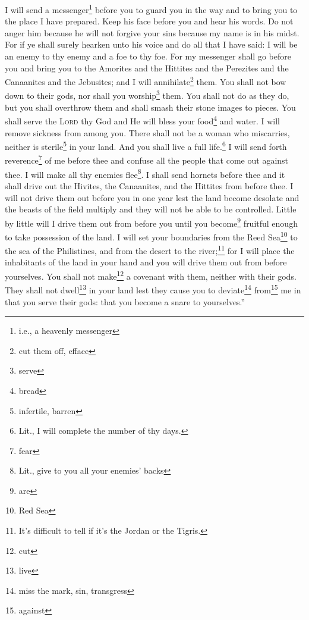 \begin{enumerate}[align=center]
     I will send a messenger\footnote{i.e., a heavenly messenger} before you to guard you in the way and to bring you to the place I have prepared.%
     Keep his face before you and hear his words. Do not anger him because he will not forgive your sins because my name is in his midst.%
     For if ye shall surely hearken unto his voice and do all that I have said: I will be an enemy to thy enemy and a foe to thy foe.%
     For my messenger shall go before you and bring you to the Amorites and the Hittites and the Perezites and the Canaanites and the Jebusites; and I will annihilate\footnote{cut them off, efface} them.%
     You shall not bow down to their gods, nor shall you worship\footnote{serve} them. You shall not do as they do, but you shall overthrow them and shall smash their stone images to pieces.%
     You shall serve the \textsc{Lord} thy God and He will bless your food\footnote{bread} and water. I will remove sickness from among you.%
     There shall not be a woman who miscarries, neither is sterile\footnote{infertile, barren} in your land. And you shall live a full life.\footnote{Lit., I will complete the number of thy days.}%
     I will send forth reverence\footnote{fear} of me before thee and confuse all the people that come out against thee. I will make all thy enemies flee\footnote{Lit., give to you all your enemies' backs}.%
     I shall send hornets before thee and it shall drive out the Hivites, the Canaanites, and the Hittites from before thee.%
     I will not drive them out before you in one year lest the land become desolate and the beasts of the field multiply and they will not be able to be controlled.%
     Little by little will I drive them out from before you until you become\footnote{are} fruitful enough to take possession of the land.%
     I will set your boundaries from the Reed Sea\footnote{Red Sea} to the sea of the Philistines, and from the desert to the river;\footnote{It's difficult to tell if it's the Jordan or the Tigris.} for I will place the inhabitants of the land in your hand and you will drive them out from before yourselves.%
     You shall not make\footnote{cut} a covenant with them, neither with their gods.%
     They shall not dwell\footnote{live} in your land lest they cause you to deviate\footnote{miss the mark, sin, transgress} from\footnote{against} me in that you serve their gods: that you become a snare to yourselves.''%
\end{enumerate}
